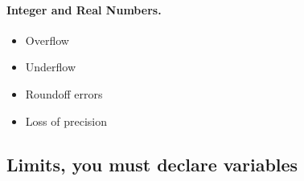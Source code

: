 \documentclass[%
twoside,                 %
final,                   %
10pt]{article}
\newenvironment{paragraphadmon}[1][]{\paragraph{#1}}{}
\begin{document}
\begin{paragraphadmon}[Integer and Real Numbers.]

\begin{itemize}
  \item Overflow

  \item Underflow

  \item Roundoff errors

  \item Loss of precision
\end{itemize}

\noindent
\end{paragraphadmon}



\subsection{Limits, you must declare variables}
\end{document}
